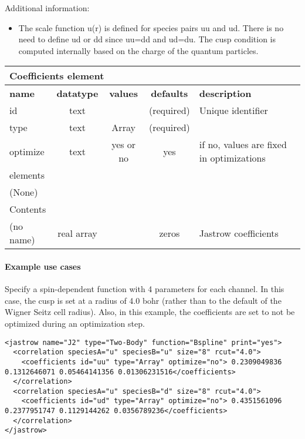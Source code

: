 \FloatBarrier

Additional information:
\begin{itemize}
\item {} The scale function u(r) is defined for species pairs uu and ud.  
There is no need to define ud or dd since uu=dd and ud=du.  The cusp condition is computed internally 
based on the charge of the quantum particles.
\end{itemize}

\begin{table}[h]
\begin{center}
\begin{tabular}{l c c c l }
\hline
\multicolumn{5}{l}{Coefficients element} \\
\hline
\bfseries name & \bfseries datatype & \bfseries values & \bfseries defaults & \bfseries description \\
\hline
id & text & & (required) & Unique identifier \\
type & text & Array & (required) & \\
optimize & text & yes or no & yes & if no, values are fixed in optimizations \\
\hline
\multicolumn{5}{l}{elements}\\ \hline
(None) & & & \\ \hline
\multicolumn{5}{l}{Contents}\\ \hline
 (no name) & real array & & zeros & Jastrow coefficients \\ \hline
\end{tabular}
\end{center}
\end{table}

\paragraph{Example use cases}
\label{sec:2bjsplineexamples}

Specify a spin-dependent function with 4 parameters for each channel.  In this case, the cusp is set at 
a radius of 4.0 bohr (rather than to the default of the Wigner Seitz cell radius).  Also, in this example,
the coefficients are set to not be optimized during an optimization step.

\begin{lstlisting}[style=QMCPXML]
<jastrow name="J2" type="Two-Body" function="Bspline" print="yes">
  <correlation speciesA="u" speciesB="u" size="8" rcut="4.0">
    <coefficients id="uu" type="Array" optimize="no"> 0.2309049836 0.1312646071 0.05464141356 0.01306231516</coefficients>
  </correlation>
  <correlation speciesA="u" speciesB="d" size="8" rcut="4.0">
    <coefficients id="ud" type="Array" optimize="no"> 0.4351561096 0.2377951747 0.1129144262 0.0356789236</coefficients>
  </correlation>
</jastrow>
\end{lstlisting}
